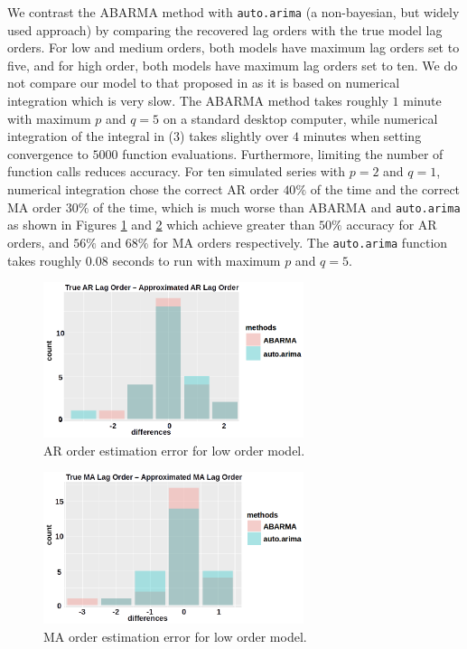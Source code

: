 We contrast the ABARMA method with {\tt auto.arima} (a non-bayesian, but widely used approach) by comparing the recovered lag orders with the true model lag orders.  For low and medium orders, both models have maximum lag orders set to five, and for high order, both models have maximum lag orders set to ten.  We do not compare our model to that proposed in \cite{monahan1982} as it is based on numerical integration which is very slow.  The ABARMA method takes roughly $1$ minute with maximum $p$ and $q = 5$ on a standard desktop computer, while numerical integration of the integral in (3) takes slightly over $4$ minutes when setting convergence to $5000$ function evaluations. Furthermore, limiting the number of function calls reduces accuracy.  For ten simulated series with $p=2$ and $q=1$, numerical integration chose the correct AR order $40\%$ of the time and the correct MA order $30\%$ of the time, which is much worse than ABARMA and {\tt auto.arima} as shown in Figures \ref{ar21} and \ref{ma21} which achieve greater than $50\%$ accuracy for AR orders, and $56\%$ and $68\%$ for MA orders respectively. The {\tt auto.arima} function takes roughly $0.08$ seconds to run with maximum $p$ and $q=5$.

\begin{figure}
    \centering
    \includegraphics[width=3in]{ar21_new}
    \caption{AR order estimation error for low order model.}
    \label{ar21}
\end{figure}

\begin{figure}
    \centering
    \includegraphics[width=3in]{ma21_new}
    \caption{MA order estimation error for low order model.}
    \label{ma21}
\end{figure}


